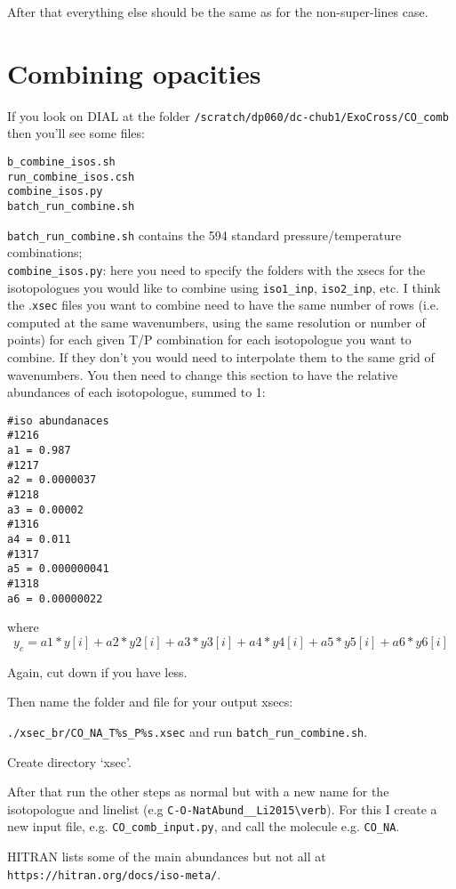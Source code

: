 \documentclass{article}
\begin{document}
After that everything else should be the same as for the non-super-lines case. 


\section{Combining opacities}


If you look on DIAL at the folder \verb!/scratch/dp060/dc-chub1/ExoCross/CO_comb! then you'll see some files: 


\noindent 
\verb!b_combine_isos.sh!\\
\verb!run_combine_isos.csh!\\
\verb!combine_isos.py! \\
\verb!batch_run_combine.sh!

\noindent 
\verb!batch_run_combine.sh! contains the 594 standard pressure/temperature combinations; \\
\verb!combine_isos.py!: here you need to specify the folders with the xsecs for the isotopologues you would like to combine using \verb!iso1_inp!, \verb!iso2_inp!, etc. 
I think the .\verb!xsec! files you want to combine need to have the same number of rows (i.e. computed at the same wavenumbers, using the same resolution or number of points) for each given T/P combination for each isotopologue you want to combine. If they don't you would need to interpolate them to the same grid of wavenumbers.
You then need to change this section to have the relative abundances of each isotopologue, summed to 1: 

\begin{verbatim}
#iso abundanaces
#1216
a1 = 0.987
#1217
a2 = 0.0000037
#1218
a3 = 0.00002
#1316
a4 = 0.011
#1317
a5 = 0.000000041
#1318
a6 = 0.00000022
\end{verbatim}
where 
$$
y_c = a1*y[i] + a2*y2[i] + a3*y3[i] + a4*y4[i] + a5*y5[i] +a6*y6[i]
$$

Again, cut down if you have less. 

Then name the folder and file for your output xsecs: 

\verb!./xsec_br/CO_NA_T%s_P%s.xsec!
and run \verb!batch_run_combine.sh!.

Create directory `xsec'.

After that run the other steps as normal but with a new name for the isotopologue and linelist (e.g \verb!C-O-NatAbund__Li2015\verb!). For this I create a new input file, e.g. \verb!CO_comb_input.py!, and call the molecule e.g. \verb!CO_NA!. 


HITRAN lists some of the main abundances but not all at \verb!https://hitran.org/docs/iso-meta/!. 
\end{document}
